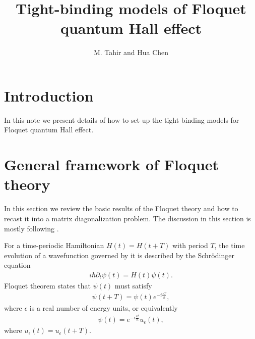 \documentclass[11pt,letterpaper]{article}
\title{Tight-binding models of Floquet quantum Hall effect}
\author{M. Tahir and Hua Chen}
\date{}
\begin{document}
\maketitle

\section{Introduction}
In this note we present details of how to set up the tight-binding models for Floquet quantum Hall effect.


\section{General framework of Floquet theory}

In this section we review the basic results of the Floquet theory and how to recast it into a matrix diagonalization problem. The discussion in this section is mostly following \cite{eckardt_2015}.

For a time-periodic Hamiltonian $H(t) = H(t+T)$ with period $T$, the time evolution of a wavefunction governed by it is described by the Schr\"{o}dinger equation
\begin{eqnarray}\label{eq:SchrHt}
i\hbar \partial_t \psi(t) = H(t) \psi(t).
\end{eqnarray}
Floquet theorem states that $\psi(t)$ must satisfy
\begin{eqnarray}
\psi(t+T) = \psi(t) e^{-i \frac{\epsilon T}{\hbar}},
\end{eqnarray}
where $\epsilon$ is a real number of energy units, or equivalently
\begin{eqnarray}
\psi(t) = e^{-i \frac{\epsilon t}{\hbar}} u_{\epsilon}(t),
\end{eqnarray}
where $u_{\epsilon}(t) = u_{\epsilon}(t+T)$. 
\end{document}
